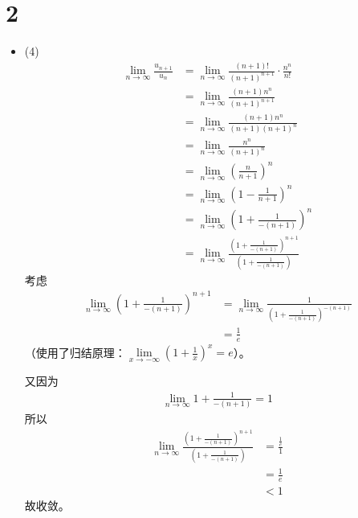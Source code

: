 \documentclass{article}
\begin{document}
\section*{2}

\begin{itemize}
  \item (4)
        \begin{align*}
          \lim\limits_{n \to \infty} \frac{u_{n + 1}}{u_n}
           & = \lim\limits_{n \to \infty} \frac{(n +1)!}{(n+1)^{n + 1}} \cdot \frac{n^n}{n!}                                    \\
           & = \lim\limits_{n \to \infty} \frac{(n +1) n^n}{(n+1)^{n + 1}}                                                      \\
           & = \lim\limits_{n \to \infty} \frac{(n +1) n^n}{(n +1)(n+1)^{n}}                                                    \\
           & = \lim\limits_{n \to \infty} \frac{n^n}{(n+1)^{n}}                                                                 \\
           & = \lim\limits_{n \to \infty} \left(\frac{n}{n+1}\right)^n                                                          \\
           & = \lim\limits_{n \to \infty} \left(1 - \frac{1}{n + 1}\right)^n                                                    \\
           & = \lim\limits_{n \to \infty} \left(1 + \frac{1}{-(n + 1)}\right)^n                                                 \\
           & = \lim\limits_{n \to \infty} \frac{\left(1 + \frac{1}{-(n + 1)}\right)^{n+1}}{\left(1 + \frac{1}{-(n + 1)}\right)}
        \end{align*}
        考虑
        \begin{align*}
          \lim\limits_{n \to \infty} \left(1 + \frac{1}{-(n + 1)}\right)^{n+1}
           & = \lim\limits_{n \to \infty} \frac{1}{\left(1 + \frac{1}{-(n + 1)}\right)^{-(n+1)}} \\
           & = \frac{1}{e}
        \end{align*}
        （使用了归结原理：$\lim\limits_{x \to -\infty} (1 + \frac{1}{x})^x = e$）。

        又因为
        \begin{align*}
          \lim\limits_{n \to \infty} 1 + \frac{1}{-(n + 1)} = 1
        \end{align*}
        所以
        \begin{align*}
          \lim\limits_{n \to \infty} \frac{\left(1 + \frac{1}{-(n + 1)}\right)^{n+1}}{\left(1 + \frac{1}{-(n + 1)}\right)}
           & = \frac{\frac{1}{e}}{1} \\
           & = \frac{1}{e}           \\
           & < 1
        \end{align*}
        故收敛。
\end{itemize}
\end{document}
